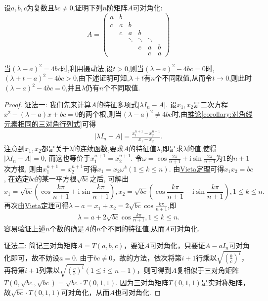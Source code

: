 \documentclass[../../main.tex]{subfiles}
\begin{document}
\begin{proposition}\label{proposition:三对角矩阵必可对角化}
设$a,b,c$为复数且$bc\neq0$,证明下列$n$阶矩阵$A$可对角化:
\[
A = 
\begin{pmatrix}
a&b&&&\\
c&a&b&&\\
&c&a&b&\\
&&\ddots&\ddots&\ddots\\
&&&c&a&b\\
&&&&c&a
\end{pmatrix}
\]
\end{proposition}
\begin{note}
当$(\lambda-a)^2=4bc$时,利用摄动法,设$t>0$,则当$(\lambda-a)^2-4bc=0$时,$(\lambda+t-a)^2-4bc>0$,由下述证明可知,$\lambda+t$有$n$个不同取值,从而令$t \to 0$,则此时$(\lambda-a)^2-4bc=0$,并且$\lambda$仍有$n$个不同取值.
\end{note}
\begin{proof}
{\color{blue}证法一:}
我们先来计算$A$的特征多项式$|\lambda I_n - A|$. 设$x_1,x_2$是二次方程$x^2 - (\lambda - a)x + bc = 0$的两个根,则当$(\lambda-a)^2\ne 4bc$时,由\hyperref[corollary:对角线元素相同的三对角行列式]{推论\ref{corollary:对角线元素相同的三对角行列式}}可得
\begin{align*}
|\lambda I_n - A|=\frac{x_1^{n + 1}-x_2^{n + 1}}{x_1 - x_2}.
\end{align*}
注意到$x_1,x_2$都是关于$\lambda$的连续函数,要求$A$的特征值$\lambda$,即是求$\lambda$的值,使得$|\lambda I_n - A| = 0$, 而这也等价于$x_1^{n + 1}=x_2^{n + 1}$. 令$\omega=\cos\frac{2\pi}{n + 1}+\mathrm{i}\sin\frac{2\pi}{n + 1}$为$1$的$n + 1$次方根, 则由$x_1^{n + 1}=x_2^{n + 1}$可得$x_1 = x_2\omega^k(1\leq k\leq n)$. 由\hyperref[theorem:Vieta定理]{Vieta定理}可得$x_1x_2 = bc$, 在选定$bc$的某一平方根$\sqrt{bc}$之后, 可解出
\[
x_1=\sqrt{bc}\left(\cos\frac{k\pi}{n + 1}+\mathrm{i}\sin\frac{k\pi}{n + 1}\right), x_2=\sqrt{bc}\left(\cos\frac{k\pi}{n + 1}-\mathrm{i}\sin\frac{k\pi}{n + 1}\right), 1\leq k\leq n.
\]
再次由\hyperref[theorem:Vieta定理]{Vieta定理}可得$\lambda - a = x_1 + x_2 = 2\sqrt{bc}\cos\frac{k\pi}{n + 1}$,即
\begin{align*}
\lambda=a + 2\sqrt{bc}\cos\frac{k\pi}{n + 1}, 1\leq k\leq n.
\end{align*}
容易验证上述$n$个数的确是$A$的$n$个不同的特征值,从而$A$可对角化.

{\color{blue}证法二:}
简记三对角矩阵\(A = T(a,b,c)\)，要证\(A\)可对角化，只要证\(A - aI_n\)可对角化即可，故不妨设\(a = 0\). 由于\(bc\neq0\)，故的方法，依次将第\(i + 1\)行乘以\(\sqrt{(\frac{b}{c})^i}\)，再将第\(i + 1\)列乘以\(\sqrt{(\frac{c}{b})^i}(1\leq i\leq n - 1)\)，则可得到\(A\)复相似于三对角矩阵\(T(0,\sqrt{bc},\sqrt{bc})=\sqrt{bc}\cdot T(0,1,1)\). 因为三对角矩阵\(T(0,1,1)\)是实对称矩阵，故\(\sqrt{bc}\cdot T(0,1,1)\)可对角化，从而\(A\)也可对角化. 
\end{proof}
\end{document}
